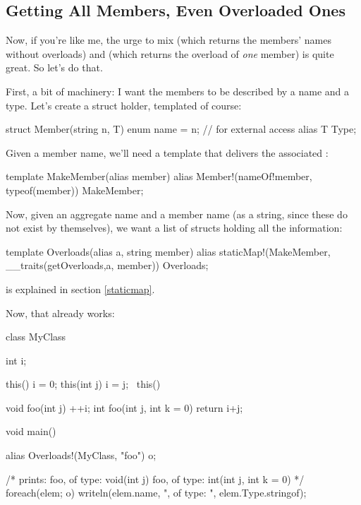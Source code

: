 \subsection{Getting All Members, Even Overloaded Ones}

Now, if you're like me, the urge to mix  (which returns the members' names without overloads) and   (which returns the overload of \emph{one} member) is quite great. So let's do that.

First, a bit of machinery: I want the members to be described by a name and a type. Let's create a struct holder, templated of course:


\begin{dcode}
struct Member(string n, T)
{
    enum name = n; // for external access
    alias T Type;
}
\end{dcode}

Given a member name, we'll need a template that delivers the associated :

\begin{dcode}
template MakeMember(alias member)
{
    alias Member!(nameOf!member, typeof(member)) MakeMember;
}
\end{dcode}

Now, given an aggregate name and a member name (as a string, since these do not exist by themselves), we want a list of  structs holding all the information:

\begin{dcode}
template Overloads(alias a, string member)
{
    alias staticMap!(MakeMember, __traits(getOverloads,a, member))
          Overloads;
}
\end{dcode}

 is explained in section \ref{staticmap}.

Now, that already works:

\begin{dcode}
class MyClass 
{
    int i;
    
    this() { i = 0;}
    this(int j) { i = j;}
    ~this() { }
    
    void foo(int j) { ++i;}
    int foo(int j, int k = 0) { return i+j;}
}

void main()
{
    alias Overloads!(MyClass, "foo") o;
    
    /* 
    prints:
    foo, of type: void(int j)
    foo, of type: int(int j, int k = 0)
    */
    foreach(elem; o) 
        writeln(elem.name, ", of type: ", elem.Type.stringof);
}
\end{dcode}

